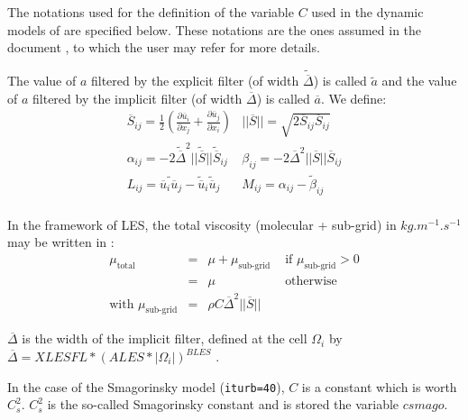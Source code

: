 {{{The notations used for the definition of the variable $C$ used in the
dynamic models of \CS are specified below. These notations are the ones
assumed in the document \cite{benhamadouche01}, to which the user may
refer for more details.

The value of $a$ filtered by the explicit filter (of width
$\widetilde{\overline{\Delta}}$) is called $\widetilde{a}$ and the value
of $a$ filtered by the implicit filter (of width $\overline{\Delta}$) is
called $\overline{a}$.
We define:
\begin{equation}
\begin{array}{ll}
\overline{S}_{ij}=\frac{1}{2}(\frac{\partial \overline{u}_i}{\partial x_j}
                  +\frac{\partial \overline{u}_j}{\partial x_i})  &
||\overline{S}||=\sqrt{2 \overline{S}_{ij}\overline{S}_{ij}}\\
\alpha_{ij}=-2\widetilde{\overline{\Delta}}^2
             ||\widetilde{\overline{S}}||
             \widetilde{\overline{S}}_{ij}&
\beta_{ij}=-2\overline{\Delta}^2
             ||\overline{S}||
               \overline{S}_{ij}\\
L_{ij}=\widetilde{\overline{u}_i\overline{u}_j}-
 \widetilde{\overline{u}}_i\widetilde{\overline{u}}_j&
M_{ij}=\alpha_{ij}-\widetilde{\beta}_{ij}\\
\end{array}
\end{equation}


In the framework of LES, the total viscosity (molecular + sub-grid) in
$kg.m^{-1}.s^{-1}$ may be written in \CS:
\begin{equation}
\begin{array}{llll}
\mu_{\text{total}}&=&\mu+\mu_{\text{sub-grid}} &
    \text{\ \ if\ \ }\mu_{\text{sub-grid}}>0\\
                   &=&\mu                          &
    \text{\ \ otherwise }\\
\text{with\ }\mu_{\text{sub-grid}}&=&\rho C \overline{\Delta}^2 ||\overline{S}||
\end{array}
\end{equation}

$\overline{\Delta}$ is the width of the implicit filter, defined at the
cell $\Omega_i$ by \\
$\overline{\Delta}=XLESFL*(ALES*|\Omega_i|)^{BLES}$
.

In the case of the Smagorinsky model (\texttt{iturb=40}), $C$ is a
constant which is worth $C_s^2$. $C_s^2$ is the so-called Smagorinsky
constant and is stored the variable \texttt{$csmago$}.

}}}
